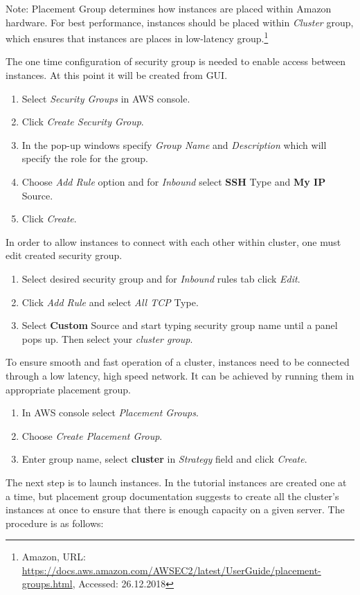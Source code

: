\documentclass[11pt,english]{article}
\begin{document}
Note: Placement Group determines how instances are placed within Amazon hardware. For best performance, instances should be placed within \textit{Cluster} group, which ensures that instances are places in low-latency group.\footnote{Amazon, URL: \url{https://docs.aws.amazon.com/AWSEC2/latest/UserGuide/placement-groups.html}, Accessed: 26.12.2018}

The one time configuration of security group is needed to enable access between instances. At this point it will be created from GUI.
\begin{enumerate}
	\item Select \textit{Security Groups} in AWS console.
	\item Click \textit{Create Security Group}.
	\item In the pop-up windows specify \textit{Group Name} and \textit{Description} which will specify the role for the group.
	\item Choose \textit{Add Rule} option and for \textit{Inbound} select \textbf{SSH} Type and \textbf{My IP} Source.
	\item Click \textit{Create}.
\end{enumerate}
In order to allow instances to connect with each other within cluster, one must edit created security group.
\begin{enumerate}
	\item Select desired security group and for \textit{Inbound} rules tab click \textit{Edit}.
	\item Click \textit{Add Rule} and select \textit{All TCP} Type.
	\item Select \textbf{Custom} Source and start typing security group name until a panel pops up. Then select your \textit{cluster group}.
\end{enumerate}
To ensure smooth and fast operation of a cluster, instances need to be connected through a low latency, high speed network. It can be achieved by running them in appropriate placement group.
\begin{enumerate}
	\item In AWS console select \textit{Placement Groups}.
	\item Choose \textit{Create Placement Group}.
	\item Enter group name, select \textbf{cluster} in \textit{Strategy} field and click \textit{Create}.
\end{enumerate}
The next step is to launch instances. In the tutorial instances are created one at a time, but placement group documentation suggests to create all the cluster's instances at once to ensure that there is enough capacity on a given server. The procedure is as follows:
\end{document}
